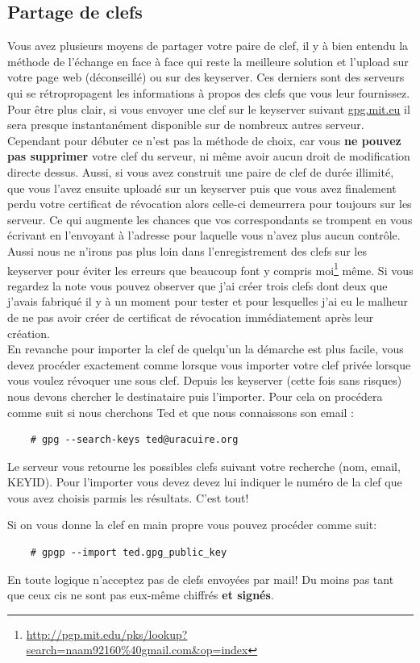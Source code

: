 \documentclass[a4paper]{article}
\begin{document}
\subsection{Partage de clefs}
Vous avez plusieurs moyens de partager votre paire de clef, il y à bien
entendu la méthode de l'échange en face à face qui reste la meilleure solution et l'upload
sur votre page web (déconseillé) ou sur des keyserver. Ces derniers sont des serveurs qui
se rétropropagent les informations à propos des clefs que vous leur fournissez.
Pour être plus clair, si vous envoyer une clef sur le keyserver suivant
\url{gpg.mit.eu} il sera presque instantanément disponible sur de nombreux autres
serveur. Cependant pour débuter ce n'est pas la méthode de choix, car vous
\textbf{ne pouvez pas supprimer} votre clef du serveur, ni même avoir aucun droit de
modification directe dessus. Aussi, si vous avez construit une paire de clef
de durée illimité,
que vous l'avez ensuite uploadé sur un keyserver puis que vous avez finalement
perdu votre certificat de révocation alors celle-ci demeurrera pour toujours
sur les serveur. Ce qui augmente les chances que vos correspondants se trompent
en vous écrivant en l'envoyant à l'adresse pour laquelle vous n'avez plus aucun
contrôle.
Aussi nous ne n'irons pas plus loin dans l'enregistrement des clefs sur les
keyserver pour éviter les erreurs que beaucoup font y compris moi\footnote{\url{http://pgp.mit.edu/pks/lookup?search=naam92160\%40gmail.com\&op=index}}
même. Si vous regardez la note vous pouvez observer que j'ai créer trois clefs
dont deux que j'avais fabriqué il y à un moment pour tester et pour lesquelles
j'ai eu le malheur de ne pas avoir créer de certificat de révocation
immédiatement après leur création.
\\
En revanche pour importer la clef de quelqu'un la démarche est plus facile,
vous devez procéder exactement comme lorsque vous importer votre clef privée
lorsque vous voulez révoquer une sous clef. Depuis les keyserver (cette fois
sans risques) nous devons chercher le destinataire puis l'importer. Pour cela
on procédera comme suit si nous cherchons Ted et que nous connaissons son email :
\begin{verbatim}
    # gpg --search-keys ted@uracuire.org
\end{verbatim}
Le serveur vous retourne les possibles clefs suivant votre recherche (nom,
email, \textsc{KEYID}). Pour l'importer vous devez devez lui indiquer le numéro
de la clef que vous avez choisis parmis les résultats. C'est tout!

Si on vous donne la clef en main propre vous pouvez procéder comme suit:
\begin{verbatim}
    # gpgp --import ted.gpg_public_key
\end{verbatim}
En toute logique n'acceptez pas de clefs envoyées par mail! Du moins pas tant
que ceux cis ne sont pas eux-même chiffrés \textbf{et signés}.
\newpage
\end{document}
